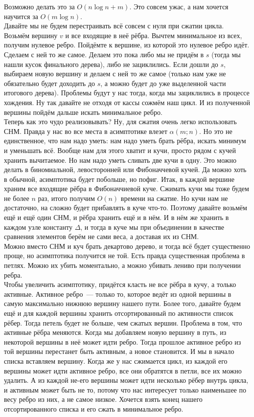 \documentclass{article}
\begin{document}
    Возможно делать это за $O(n\log n+m)$. Это совсем ужас, а нам хочется научится за $O(m\log n)$.\\
    Давайте мы не будем перестраивать всё совсем с нуля при сжатии цикла. Возьмём вершину $v$ и все входящие в неё рёбра. Вычтем минимальное из всех, получим нулевое ребро. Пойдёмте к вершине, из которой это нулевое ребро идёт. Сделаем с ней то же самое. Делаем это пока либо мы не придём в $s$ (тогда мы нашли кусок финального дерева), либо не зациклились. Если дошли до $s$, выбираем новую вершину и делаем с ней то же самое (только нам уже не обязательно будет доходить до $s$, а можно будет до уже выделенной части итогового дерева). Проблемы будут у нас тогда, когда мы зациклились в процессе хождения. Ну так давайте не отходя от кассы сожмём наш цикл. И из полученной вершины пойдём дальше искать минимальное ребро.\\
    Теперь как это чудо реализовывать? Ну, для сжатия очень легко использовать СНМ. Правда у нас во все места в асимптотике влезет $\alpha(m;n)$. Но это не единственное, что нам надо уметь: нам надо уметь брать рёбра, искать минимум и уменьшать всё. Вообще нам для этого хватит и кучи, просто рядом с кучей хранить вычитаемое. Но нам надо уметь сливать две кучи в одну. Это можно делать в биномиальной, левосторонней или Фибоначчевой кучей. Да можно хоть в обычной, асимптотика будет побольше, но пофиг. Итак, в каждой вершине храним все входящие рёбра в Фибоначчиевой куче. Сжимать кучи мы тоже будем не более $n$ раз, итого получим $O(n)$ времени на сжатие. Но кучи нам не достаточно, на сложно будет прибавлять в куче что-то. Поэтому давайте возьмём ещё и ещё один СНМ, и рёбра хранить ещё и в нём. И в нём же хранить в каждом узле константу $\Delta$, и тогда в куче мы при объединении в качестве сравнения элементов берём не сами веса, а доставая их из СНМ.\\
    Можно вместо СНМ и куч брать декартово дерево, и тогда всё будет существенно проще, но асимптотика получится не той. Есть правда существенная проблема в петлях. Можно их убить моментально, а можно убивать лениво при получении ребра.\\
    Чтобы увеличить асимптотику, придётся класть не все рёбра в кучу, а только активные. Активное ребро~--- только то, которое ведёт из одной вершины в самую максимально нижнюю вершину нашего пути. Более того, давайте будем ещё и для каждой вершины хранить отсортированный по активности список рёбер. Тогда петель будет не больше, чем сжатых вершин. Проблема в том, что активные рёбра меняются. Когда мы добавляем новую вершину в путь, из некоторой вершины в неё может идти ребро. Тогда прошлое активное ребро из той вершины перестанет быть активным, а новое становится. И мы в начало списка вставляем вершину. Когда же у нас сжимается цикл, из каждой его вершины может идти активное ребро, все они обратятся в петли, все их можно удалить. А из каждой не-его вершины может идти несколько рёбер внутрь цикла, и активным может быть не то, потому что нас интересует только наименьшее по весу ребро из них, а не самое низкое. Хочется взять конец нашего отсортированного списка и его сжать в минимальное ребро.
    
\end{document}
